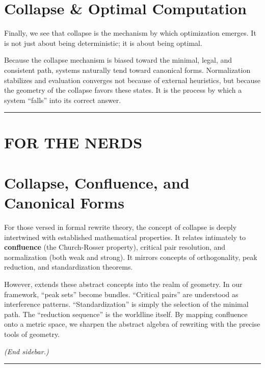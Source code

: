 \section{\texorpdfstring{\textbf{Collapse \& Optimal Computation}}{13.9 --- Collapse \& Optimal Computation}}

Finally, we see that collapse is the mechanism by which optimization emerges. It is not just about being deterministic; it is about being optimal.

Because the collapse mechanism is biased toward the minimal, legal, and consistent path, systems naturally tend toward canonical forms. Normalization stabilizes and evaluation converges not because of external heuristics, but because the geometry of the collapse favors these states. It is the process by which a system ``falls'' into its correct answer.

\begin{center}\rule{0.5\linewidth}{0.5pt}\end{center}

\section*{\textbf{FOR THE NERDS\texttrademark}}

\section{\texorpdfstring{\textbf{Collapse, Confluence, and Canonical Forms}}{13.10 --- Collapse, Confluence, and Canonical Forms}}

For those versed in formal rewrite theory, the concept of collapse is deeply intertwined with established mathematical properties. It relates intimately to \textbf{confluence} (the Church-Rosser property), critical pair resolution, and normalization (both weak and strong). It mirrors concepts of orthogonality, peak reduction, and standardization theorems.

However, \COMPUTER{} extends these abstract concepts into the realm of geometry. In our framework, ``peak sets'' become bundles. ``Critical pairs'' are understood as interference patterns. ``Standardization'' is simply the selection of the minimal path. The ``reduction sequence'' is the worldline itself. By mapping confluence onto a metric space, we sharpen the abstract algebra of rewriting with the precise tools of geometry.

\textit{(End sidebar.)}

\begin{center}\rule{0.5\linewidth}{0.5pt}\end{center}

